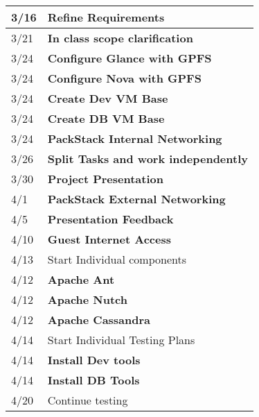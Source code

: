 \begin{center}
\begin{adjustwidth}[]{-1in}{-1in}
\begin{table}[H]
\begin{tabularx}{\textwidth}{| p{3cm} | X |}
      3/16 & \textbf{Refine Requirements} \\ \hline

      3/21 & \textbf{In class scope clarification} \\ \hline

      3/24 & \textbf{Configure Glance with GPFS} \\ \hline

      3/24 & \textbf{Configure Nova with GPFS} \\ \hline

      3/24 & \textbf{Create Dev VM Base} \\ \hline
      
      3/24 & \textbf{Create DB VM Base} \\ \hline

      3/24 & \textbf{PackStack Internal Networking} \\ \hline

      3/26 & \textbf{Split Tasks and work independently} \\ \hline

      3/30 & \textbf{Project Presentation} \\ \hline

      4/1 & \textbf{PackStack External Networking} \\ \hline

      4/5 & \textbf{Presentation Feedback} \\ \hline

      4/10 & \textbf{Guest Internet Access} \\ \hline

      4/13 & Start Individual components \\ \hline

      4/12 & \textbf{Apache Ant} \\ \hline
   
      4/12 & \textbf{Apache Nutch} \\ \hline

      4/12 & \textbf{Apache Cassandra} \\ \hline

      4/14 & Start Individual Testing Plans \\ \hline

      4/14 & \textbf{Install Dev tools} \\ \hline
  
      4/14 & \textbf{Install DB Tools} \\ \hline

      4/20 & Continue testing \\ \hline


\end{tabularx}
\end{table}
\end{adjustwidth}
\end{center}
